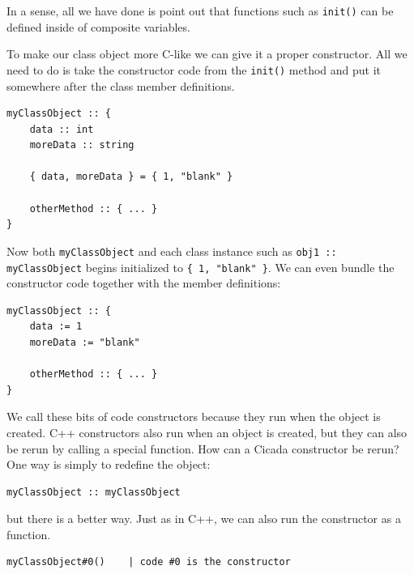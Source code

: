 \documentclass{article}
\newenvironment{code}{
       \begin{list}{}{
               \setlength{\leftmargin}{.4in}
               \setlength{\rightmargin}{0in}
               \setlength{\topsep}{.2in}
       }
       \small
       \item[] }
       { \end{list}   }
\begin{document}
\noindent In a sense, all we have done is point out that functions such as \verb#init()# can be defined inside of composite variables.

To make our class object more C-like we can give it a proper constructor.  All we need to do is take the constructor code from the \verb#init()# method and put it somewhere after the class member definitions.

\begin{code} \begin{verbatim}
myClassObject :: {
    data :: int
    moreData :: string
    
    { data, moreData } = { 1, "blank" }
    
    otherMethod :: { ... }
}
\end{verbatim} \end{code}

\noindent Now both \verb#myClassObject# and each class instance such as \verb#obj1 :: myClassObject# begins initialized to \verb${ 1, "blank" }$.  We can even bundle the constructor code together with the member definitions:

\begin{code} \begin{verbatim}
myClassObject :: {
    data := 1
    moreData := "blank"
    
    otherMethod :: { ... }
}
\end{verbatim} \end{code}

We call these bits of code constructors because they run when the object is created.  C++ constructors also run when an object is created, but they can also be rerun by calling a special function.  How can a Cicada constructor be rerun?  One way is simply to redefine the object:

\begin{code} \begin{verbatim}
myClassObject :: myClassObject
\end{verbatim} \end{code}

\noindent but there is a better way.  Just as in C++, we can also run the constructor as a function.

\begin{code} \begin{verbatim}
myClassObject#0()    | code #0 is the constructor
\end{verbatim} \end{code}
\end{document}
